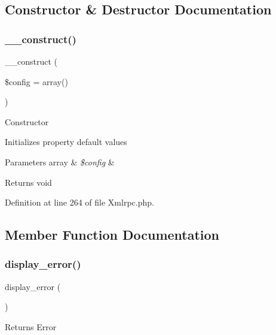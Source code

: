 \subsection{Constructor \& Destructor Documentation}
\mbox{\label{class_c_i___xmlrpc_af7f9493844d2d66e924e3c1df51ce616}} 
\subsubsection{\texorpdfstring{\_\_construct()}{\_\_construct()}}
{\footnotesize\ttfamily \+\_\+\+\_\+construct (\begin{DoxyParamCaption}\item[{}]{\$config = {\ttfamily array()} }\end{DoxyParamCaption})}

Constructor

Initializes property default values


\begin{DoxyParams}[1]{Parameters}
array & {\em \$config} & \\
\hline
\end{DoxyParams}
\begin{DoxyReturn}{Returns}
void 
\end{DoxyReturn}


Definition at line 264 of file Xmlrpc.\+php.



\subsection{Member Function Documentation}
\mbox{\label{class_c_i___xmlrpc_adf0d809d39e17bc0e08387436db31386}} 
\subsubsection{\texorpdfstring{display\_error()}{display\_error()}}
{\footnotesize\ttfamily display\+\_\+error (\begin{DoxyParamCaption}{ }\end{DoxyParamCaption})}

Returns Error

